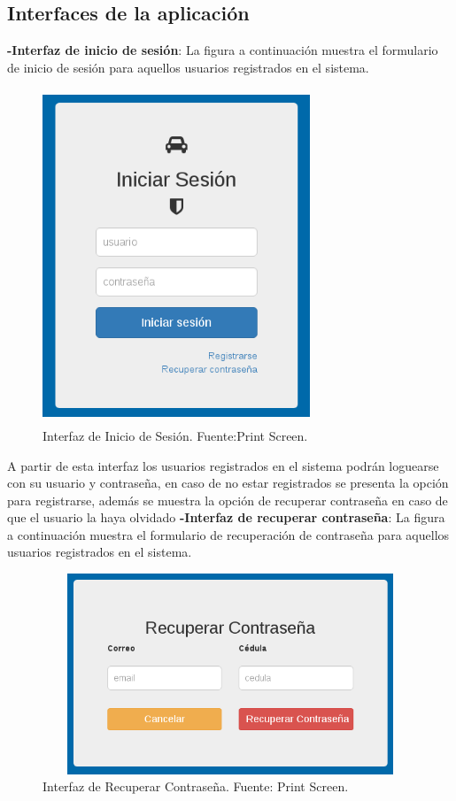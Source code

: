 \newpage
\subsection{Interfaces de la aplicación}
\setlength{\parskip}{5mm}

\textbf{-Interfaz de inicio de sesión}: La figura a continuación muestra el formulario de inicio de sesión para aquellos usuarios registrados en el sistema.

\begin{figure}[H]
\begin{center}
	\includegraphics[width=8cm,height=10cm]{img/interfaces/inicio_sesion.png}
\end{center}
\caption{Interfaz de Inicio de Sesión. Fuente:Print Screen.}
\label{fig:interfaz_inicion_sesion}
\end{figure}

A partir de esta interfaz los usuarios registrados en el sistema podrán loguearse con su usuario y contraseña, en caso de no estar registrados se presenta la opción para registrarse, además se muestra la opción de recuperar contraseña en caso de que el usuario la haya olvidado
\newpage
\textbf{-Interfaz de recuperar contraseña}: La figura a continuación muestra el formulario de recuperación de contraseña para aquellos usuarios registrados en el sistema.


\begin{figure}[H]
\begin{center}
	\includegraphics[width=14cm,height=6cm]{img/interfaces/recuperar_contrasena.png}
\end{center}
\caption{Interfaz de Recuperar Contraseña. Fuente: Print Screen.}
\label{fig:interfaz_recuperar_contrasena}
\end{figure}

